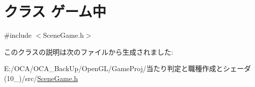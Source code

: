 \hypertarget{class_xE3_x82_xB2_xE3_x83_xBC_xE3_x83_xA0_xE4_xB8_xAD}{\section{クラス ゲーム中}
\label{class_xE3_x82_xB2_xE3_x83_xBC_xE3_x83_xA0_xE4_xB8_xAD}
}


{\ttfamily \#include $<$Scene\-Game.\-h$>$}



このクラスの説明は次のファイルから生成されました\-:\begin{DoxyCompactItemize}
\item 
E\-:/\-O\-C\-A/\-O\-C\-A\-\_\-\-Back\-Up/\-Open\-G\-L/\-Game\-Proj/当たり判定と職種作成とシェーダ(10\-\_)/src/\hyperlink{_scene_game_8h}{Scene\-Game.\-h}\end{DoxyCompactItemize}
